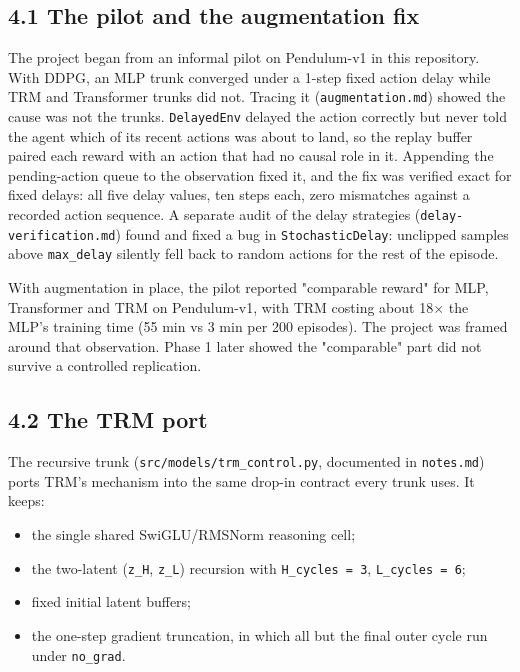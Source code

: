 \documentclass[11pt]{article}
\begin{document}
\subsection*{4.1 The pilot and the augmentation fix}



The project began from an informal pilot on Pendulum-v1 in this repository. With DDPG, an MLP trunk converged under a 1-step fixed action delay while TRM and Transformer trunks did not. Tracing it (\texttt{augmentation.\allowbreak{}md}) showed the cause was not the trunks. \texttt{DelayedEnv} delayed the action correctly but never told the agent which of its recent actions was about to land, so the replay buffer paired each reward with an action that had no causal role in it. Appending the pending-action queue to the observation fixed it, and the fix was verified exact for fixed delays: all five delay values, ten steps each, zero mismatches against a recorded action sequence. A separate audit of the delay strategies (\texttt{delay-verification.\allowbreak{}md}) found and fixed a bug in \texttt{StochasticDelay}: unclipped samples above \texttt{max\_delay} silently fell back to random actions for the rest of the episode.



With augmentation in place, the pilot reported "comparable reward" for MLP, Transformer and TRM on Pendulum-v1, with TRM costing about 18$\times$ the MLP's training time (55 min vs 3 min per 200 episodes). The project was framed around that observation. Phase 1 later showed the "comparable" part did not survive a controlled replication.



\subsection*{4.2 The TRM port}



The recursive trunk (\texttt{src/\allowbreak{}models/\allowbreak{}trm\_\allowbreak{}control.\allowbreak{}py}, documented in \texttt{notes.md}) ports TRM's mechanism into the same drop-in contract every trunk uses. It keeps:



\begin{itemize}
\item the single shared SwiGLU/RMSNorm reasoning cell;
\item the two-latent (\texttt{z\_H}, \texttt{z\_L}) recursion with \texttt{H\_cycles = 3}, \texttt{L\_cycles = 6};
\item fixed initial latent buffers;
\item the one-step gradient truncation, in which all but the final outer cycle run under \texttt{no\_grad}.
\end{itemize}
\end{document}
